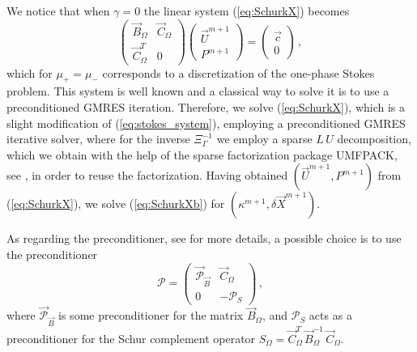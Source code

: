 We notice that when $\gamma = 0$ the linear system (\ref{eq:SchurkX}) becomes
\begin{equation} \label{eq:stokes_system}
\begin{pmatrix}
\vec B_\Omega & \vec C_\Omega \\
\vec C_\Omega^T & 0
\end{pmatrix}
\begin{pmatrix}
\vec U^{m+1} \\ P^{m+1}
\end{pmatrix}
= \begin{pmatrix}
\vec c \\
0
\end{pmatrix}\,,
\end{equation}
which for $\mu_+=\mu_-$ corresponds to a discretization of the one-phase
Stokes problem. This system is well known and a classical way to solve it is to
use a preconditioned GMRES iteration. Therefore, we solve (\ref{eq:SchurkX}),
which is a slight modification of (\ref{eq:stokes_system}), employing a
preconditioned GMRES iterative solver, where for the inverse $\Xi_\Gamma^{-1}$
we employ a sparse $L\,U$ decomposition, which we obtain with the help of the
sparse factorization package UMFPACK, see \cite{Davis04}, in order to reuse the
factorization. Having obtained $(\vec U^{m+1}, P^{m+1})$ from
(\ref{eq:SchurkX}), we solve (\ref{eq:SchurkXb}) for $(\kappa^{m+1}, \delta\vec
X^{m+1})$.

As regarding the preconditioner, see \cite{ElmanSW05} for more details, a
possible choice is to use the preconditioner
\begin{equation} \label{eq:ESW}
\mathcal{P} = \begin{pmatrix}
\vec{\mathcal{P}}_{\vec B} & \vec C_\Omega \\
0 & -\mathcal{P}_S
\end{pmatrix}\,,
\end{equation}
where $\vec{\mathcal{P}}_{\vec B}$ is some preconditioner for the matrix $\vec
B_\Omega$, and $\mathcal{P}_S$ acts as a preconditioner for the Schur complement
operator $S_\Omega=\vec C^T_\Omega \,\vec B_\Omega^{-1}\,\vec C_\Omega$.


